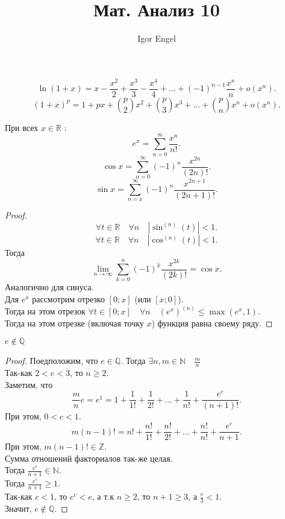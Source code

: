 \documentclass[11pt, oneside]{article}   	%
\title{Мат. Анализ 10}
\author{Igor Engel}
\date{}
\begin{document}
\maketitle
\section{}
    \subsection{}
    \[ \ln(1+x) = x - \frac{x^2}{2} + \frac{x^3}{3} - \frac{x^{4}}{4} + \ldots + (-1)^{n-1}\frac{x^{n}}{n} + o(x^{n}) .\] 
    \[ (1+x)^{p} = 1 + px + \binom{p}{2}x^2 + \binom{p}{3}x^3  + \ldots + \binom{p}{n}x^{n} + o(x^{n}).\]
    \begin{theorem}
        При всех $x\in \mathbb{R}$ :
        \[ e^{x} = \sum\limits_{n=0}^{\infty} \frac{x^{n}}{n!} .\] 
        \[ \cos x = \sum\limits_{n=0}^{\infty} (-1)^{n} \frac{x^{2n}}{(2n)!} .\]
        \[ \sin x = \sum\limits_{n=x}^{\infty} (-1)^{n} \frac{x^{2n+1}}{(2n+1)!} .\]
        \begin{proof}
            \[ \forall{t\in \mathbb{R}}\quad \forall{n}\quad \left|\sin^{(n)}(t)\right| < 1 .\]
            \[ \forall{t\in \mathbb{R}}\quad \forall{n}\quad \left|\cos^{(n)}(t)\right| < 1 .\]
            Тогда
            \[ \lim\limits_{n \to \infty} \sum\limits_{k=0}^{n} (-1)^{k}\frac{x^{2k}}{(2k)!} = \cos x .\]
            Аналогично для синуса.\\
            Для $e^{x}$ рассмотрим отрезко $\left[0; x\right]$ (или $\left[x; 0\right]$).\\
            Тогда на этом отрезок $\forall{t\in \left[0; x\right]}\quad \forall{n}\quad (e^{x})^{(n)} \le \max\left( e^{x}, 1 \right) $.\\
            Тогда на этом отрезке (включая точку $x$) функция равна своему ряду.
        \end{proof}
    \end{theorem}
    \begin{theorem}
        $e \not\in \mathbb{Q}$ 
        \begin{proof}
        Поедположим, что $e\in \mathbb{Q}$. Тогда $\exists{n,m\in \mathbb{N}}\quad \frac{m}{n}$\\
        Так-как $2 <e < 3$, то $n\ge 2$.\\
        Заметим, что 
        \[ \frac{m}{n} e = e^{1} = 1 + \frac{1}{1!} + \frac{1}{2!} + \ldots + \frac{1}{n!} + \frac{e^{c}}{(n+1)!} .\]
        При этом, $0 < c < 1$.\\
        \[ m(n-1)! = n! + \frac{n!}{1!} + \frac{n!}{2!} + \ldots + \frac{n!}{n!} + \frac{e^{c}}{n+1} .\]
        При этом, $m(n-1)!\in \mathbb{Z}$.\\
        Сумма отношений факториалов так-же целая.\\
        Тогда $\frac{e^{c}}{n+1}\in \mathbb{N}$.\\
        Тогда $\frac{e^{c}}{n+1} \ge 1$.\\
        Так-как $c<1$, то $e^{c} < e$, а т.к $n\ge 2$, то $n+1 \ge 3$, а $\frac{e}{3} < 1$.\\
        Значит, $e \not\in \mathbb{Q}$.
        \end{proof}
    \end{theorem}
\end{document}
